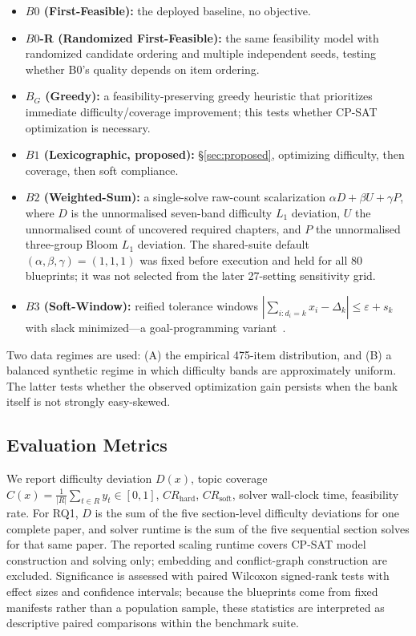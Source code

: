 \documentclass[runningheads]{llncs}
\begin{document}
\begin{itemize}
    \item \textbf{$B0$ (First-Feasible):} the deployed baseline, no objective.
    \item \textbf{$B0$-R (Randomized First-Feasible):} the same feasibility model with randomized candidate ordering and multiple independent seeds, testing whether B0's quality depends on item ordering.
    \item \textbf{$B_G$ (Greedy):} a feasibility-preserving greedy heuristic that prioritizes immediate difficulty/coverage improvement; this tests whether CP-SAT optimization is necessary.
    \item \textbf{$B1$ (Lexicographic, proposed):} \S\ref{sec:proposed}, optimizing difficulty, then coverage, then soft compliance.
    \item \textbf{$B2$ (Weighted-Sum):} a single-solve raw-count scalarization $\alpha D+\beta U+\gamma P$, where $D$ is the unnormalised seven-band difficulty $L_1$ deviation, $U$ the unnormalised count of uncovered required chapters, and $P$ the unnormalised three-group Bloom $L_1$ deviation.
The shared-suite default $(\alpha,\beta,\gamma)=(1,1,1)$ was fixed before execution and held for all 80 blueprints;
it was not selected from the later 27-setting sensitivity grid.
    \item \textbf{$B3$ (Soft-Window):} reified tolerance windows $|\sum_{i:d_i=k}x_i-\Delta_k|\le\varepsilon+s_k$ with slack minimized---a goal-programming variant~\cite{ignizio1976}.
\end{itemize}

Two data regimes are used: (A) the empirical 475-item distribution, and (B) a balanced synthetic regime in which difficulty bands are approximately uniform.
The latter tests whether the observed optimization gain persists when the bank itself is not strongly easy-skewed.

\subsection{Evaluation Metrics}
We report difficulty deviation $D(x)$, topic coverage $C(x)=\frac{1}{|R|}\sum_{t\in R} y_t\in[0,1]$, $CR_{\mathrm{hard}}$, $CR_{\mathrm{soft}}$, solver wall-clock time, feasibility rate.
For RQ1, $D$ is the sum of the five section-level difficulty deviations for one complete paper, and solver runtime is the sum of the five sequential section solves for that same paper.
The reported scaling runtime covers CP-SAT model construction and solving only; embedding and conflict-graph construction are excluded.
Significance is assessed with paired Wilcoxon signed-rank tests with effect sizes and confidence intervals; because the blueprints come from fixed manifests rather than a population sample, these statistics are interpreted as descriptive paired comparisons within the benchmark suite.
\end{document}
